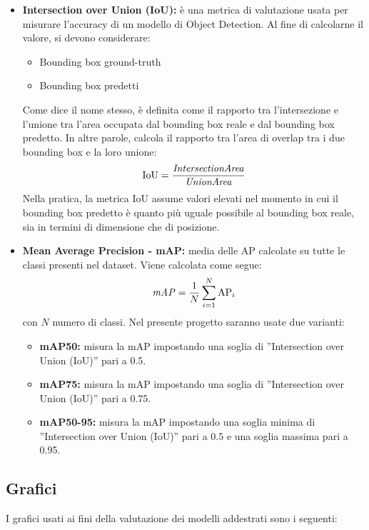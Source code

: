 \documentclass[12pt]{article}
\begin{document}
\begin{itemize}
    \item \textbf{Intersection over Union (IoU):} è una metrica di valutazione usata per misurare l’accuracy di un modello di Object Detection. Al fine di calcolarne il valore, si devono considerare:
    \begin{itemize}
        \item Bounding box ground-truth
        \item Bounding box predetti
    \end{itemize}
    Come dice il nome stesso, è definita come il rapporto tra l’intersezione e l’unione tra l’area occupata dal bounding box reale e dal bounding box predetto. In altre parole, calcola il rapporto tra l’area di overlap tra i due bounding box e la loro unione:
    $$ \text{IoU} = \frac{\text{\textit{IntersectionArea}}}{\text{\textit{UnionArea}}} $$
    Nella pratica, la metrica IoU assume valori elevati nel momento in cui il bounding box predetto è quanto più uguale possibile al bounding box reale, sia in termini di dimensione che di posizione.

    \item \textbf{Mean Average Precision - mAP:} media delle AP calcolate su tutte le classi presenti nel dataset. Viene calcolata come segue:
    $$ \text{\textit{mAP}} = \frac{1}{N} \sum_{i=1}^{N} \text{AP}_i $$
    con $N$ numero di classi. Nel presente progetto saranno usate due varianti:
    \begin{itemize}
        \item \textbf{mAP50:} misura la mAP impostando una soglia di ”Intersection over Union (IoU)” pari a 0.5.
        \item \textbf{mAP75:} misura la mAP impostando una soglia di ”Intersection over Union (IoU)” pari a 0.75.
        \item \textbf{mAP50-95:} misura la mAP impostando una soglia minima di ”Intersection over Union (IoU)” pari a 0.5 e una soglia massima pari a 0.95.
    \end{itemize}
\end{itemize}

\subsection{Grafici}
I grafici usati ai fini della valutazione dei modelli addestrati sono i seguenti:
\end{document}
